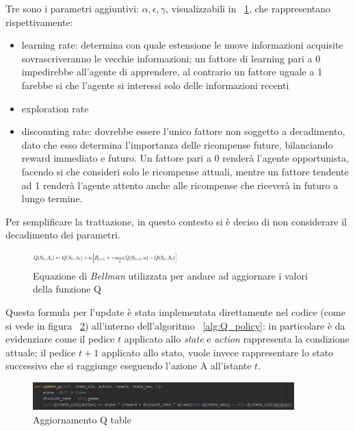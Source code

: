 Tre sono i parametri aggiuntivi: $\alpha,\epsilon,\gamma$, visualizzabili in ~\ref{fig:Q_estimation}, che rappresentano rispettivamente:
\begin{itemize}
	\item learning rate: determina con quale estensione le nuove informazioni acquisite sovrascriveranno le vecchie informazioni; un fattore di learning pari a 0 impedirebbe all'agente di apprendere, al contrario un fattore uguale a 1 farebbe si che l'agente si interessi solo delle informazioni recenti
	\item exploration rate
	\item discounting rate: dovrebbe essere l'unico fattore non soggetto a decadimento, dato che esso determina l'importanza delle ricompense future, bilanciando reward immediato e futuro. Un fattore pari a 0 renderà l'agente opportunista, facendo si che consideri solo le ricompense attuali, mentre un fattore tendente ad 1 renderà l'agente attento anche alle ricompense che riceverà in futuro a lungo termine.
\end{itemize}
Per semplificare la trattazione, in questo contesto si è deciso di non considerare il decadimento dei parametri.

\begin{figure}[!h]
	\centering
	\includegraphics[width=0.5\textwidth]{Immagini/Q_estimation.JPG}
	\caption{Equazione di \textit{Bellman} utilizzata per andare ad aggiornare i valori della funzione Q}
	\label{fig:Q_estimation}
\end{figure}

Questa formula per l'update è stata implementata direttamente nel codice (come si vede in figura ~\ref{fig:Q_update}) all'interno dell'algoritmo ~\ref{alg:Q_policy}: in particolare è da evidenziare come il pedice $t$ applicato allo \textit{state} e \textit{action} rappresenta la condizione attuale; il pedice $t+1$ applicato allo stato, vuole invece rappresentare lo stato successivo che si raggiunge eseguendo l'azione A all'istante $t$.

\begin{figure}[!h]
	\centering
	\includegraphics[width=0.9\textwidth]{Immagini/Q_update.JPG}
	\caption{Aggiornamento Q table}
	\label{fig:Q_update}
\end{figure}

